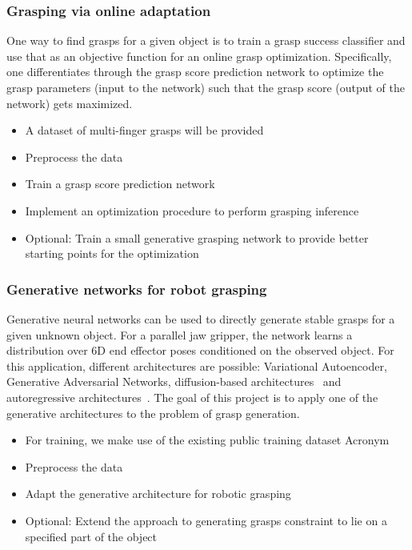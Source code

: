 \documentclass[a4paper]{article}
\begin{document}
\subsubsection{Grasping via online adaptation}
One way to find grasps for a given object is to train a grasp success classifier and use that as an objective function for an online grasp optimization.
Specifically, one differentiates through the grasp score prediction network to optimize the grasp parameters (input to the network) such that the grasp score (output of the network) gets maximized.

\begin{itemize}
  \item A dataset of multi-finger grasps will be provided~\cite{winkelbauer2022}
  \item Preprocess the data
  \item Train a grasp score prediction network~\cite{van2020learning}
  \item Implement an optimization procedure to perform grasping inference
  \item Optional: Train a small generative grasping network to provide better starting points for the optimization
\end{itemize}

\subsubsection{Generative networks for robot grasping}
Generative neural networks can be used to directly generate stable grasps for a given unknown object.
For a parallel jaw gripper, the network learns a distribution over 6D end effector poses conditioned on the observed object.
For this application, different architectures are possible: Variational Autoencoder, Generative Adversarial Networks, diffusion-based architectures~\cite{ho2020denoising} and autoregressive architectures~\cite{winkelbauer2022}.
The goal of this project is to apply one of the generative architectures to the problem of grasp generation.
\begin{itemize}
  \item For training, we make use of the existing public training dataset Acronym~\cite{acronym2020}
  \item Preprocess the data
  \item Adapt the generative architecture for robotic grasping
  \item Optional: Extend the approach to generating grasps constraint to lie on a specified part of the object~\cite{lundell2023constrained}
\end{itemize}
\end{document}

